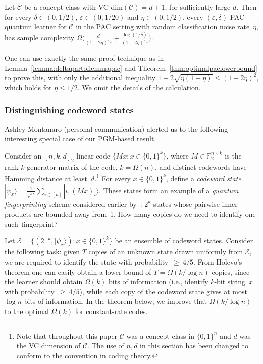 \documentclass[twoside,11pt]{article}
\newcommand{\eps}{\varepsilon}
\newcommand{\ket}[1]{|#1\rangle}
\newcommand{\F}{\ensuremath{\mathbb{F}}}
\newcommand{\E}{\mathcal{E}}
\def\01{\{0,1\}}
\newcommand{\C}{\ensuremath{\mathscr{C}}}
\begin{document}
\begin{theorem}
	Let $\C$ be a concept class with VC-dim$(\C)=d+1$, for sufficiently large $d$. Then for every $\delta\in (0,1/2)$, $\eps \in (0,1/20)$ and $\eta \in (0,1/2)$, every $(\eps,\delta)$-PAC quantum learner for $\C$ in the PAC setting with random classification noise rate~$\eta$, has sample complexity 
	$\Omega\Big(\frac{d}{(1-2\eta)^2\eps} + \frac{\log(1/\delta)}{(1-2\eta)^2\eps}\Big)$.
\end{theorem}

One can use exactly the same proof technique as in Lemma~\ref{lemma:deltapartoflemmapac} and Theorem~\ref{thm:optimalpaclowerbound} to prove this, with only the additional inequality $1-2\sqrt{\eta(1-\eta)}\leq (1-2\eta)^2$, which holds for $\eta\leq 1/2$. We omit the details of the calculation.

\subsubsection{Distinguishing codeword states}
\label{section:distinguisingcodeword}
Ashley Montanaro (personal communication) alerted us to the following interesting special case of our PGM-based result.

Consider an $[n,k,d]_2$ linear code $\{Mx:x\in \01^k\}$, where $M\in \F^{n\times k}_2$ is the rank-$k$ generator matrix of the code, $k=\Omega(n)$, and distinct codewords have Hamming distance at least~$d$.\footnote{Note that throughout this paper $\C$ was a concept class in $\01^n$ and $d$ was the VC dimension of $\C$. The use of $n,d$ in this section has been changed to conform to the convention in coding theory.} For every $x\in \01^k$, define a \emph{codeword state} $\ket{\psi_x}=\frac{1}{\sqrt{n}} \sum_{i\in [n]} \ket{i,(Mx)_i}$. These states form an example of a \emph{quantum fingerprinting} scheme considered earlier by~\cite{bcww:fp}: $2^k$ states whose pairwise inner products are bounded away from~1. How many copies do we need to identify one such~fingerprint?

Let $\E=\{(2^{-k},\ket{\psi_x}):x\in \01^k\}$ be an ensemble of codeword states. Consider the following task: given $T$ copies of an unknown state drawn uniformly from $\E$, we are required to identify the state with probability~$\geq~4/5$. From Holevo's theorem one can easily obtain a lower bound of $T=\Omega(k / \log n)$ copies, since the learner should obtain $\Omega(k)$ bits of information (i.e., identify $k$-bit string~$x$ with probability~$\geq~4/5$), while each copy of the codeword state gives at most $\log n$ bits of information.
In the theorem below, we improve that $\Omega(k / \log n)$ to the optimal $\Omega(k)$ for constant-rate codes.
\end{document}
